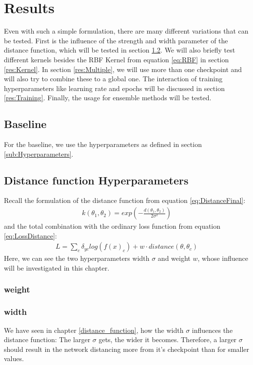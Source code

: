 \chapter{Results}
Even with such a simple formulation, there are many different variations that
can be tested. First is the influence of the strength and width parameter of the
distance function, which will be tested in section \ref{res:Hyperparameters}. We
will also briefly test different kernels besides the RBF Kernel from equation
\ref{eq:RBF} in section \ref{res:Kernel}. In section \ref{res:Multiple}, we will
use more than one checkpoint and will also try to combine these to a global one.
The interaction of training hyperparameters like learning rate and epochs will
be discussed in section \ref{res:Training}. Finally, the usage for ensemble
methods will be tested.

\section{Baseline}
For the baseline, we use the hyperparameters as defined in section
\ref{sub:Hyperparameters}.






\section{Distance function Hyperparameters}\label{res:Hyperparameters}
Recall the formulation of the distance function from equation
\ref{eq:DistanceFinal}:
\begin{align}
    k(\theta_1, \theta_2)=exp(-\frac{d(\theta_1, \theta_2)}{2\sigma^2})
\end{align}
and the total combination with the ordinary loss function from equation
\ref{eq:LossDistance}:
\begin{align}
    L=\sum_{c} \delta_{yc} log(f(x)_c) + w \cdot distance(\theta, \theta_c)
\end{align}
Here, we can see the two hyperparameters width $\sigma$ and weight $w$, whose
influence will be investigated in this chapter.
\subsection{weight}

\subsection{width}
We have seen in chapter \ref{distance_function}, how the width $\sigma$
influences the distance function: The larger $\sigma$ gets, the wider it
becomes. Therefore, a larger $\sigma$ should result in the network distancing
more from it's checkpoint than for smaller values.






